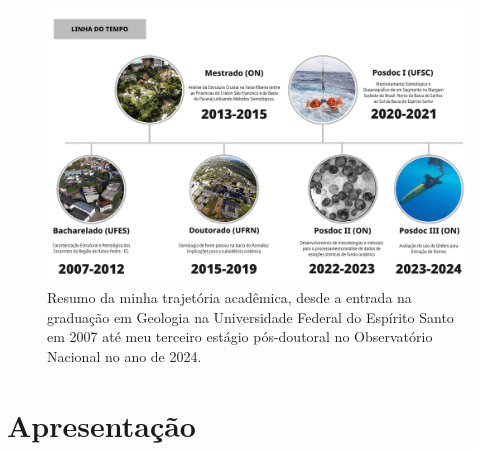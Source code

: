 \documentclass[10pt,a4paper,oneside]{book}
\begin{document}
\begin{landscape}
\begin{figure}[tb]
  \begin{center}
    \includegraphics[width=\pagewidth]{images/linha_do_tempo.png}
  \end{center}
  \caption*{
    Resumo da minha trajetória acadêmica, desde a entrada na graduação em Geologia na Universidade Federal do Espírito Santo em 2007 até meu terceiro estágio pós-doutoral no Observatório Nacional no ano de 2024.
    }
\end{figure}
\end{landscape}
\tableofcontents

\mainmatter
\pagestyle{fancy}

\chapter{Apresentação}
\end{document}
